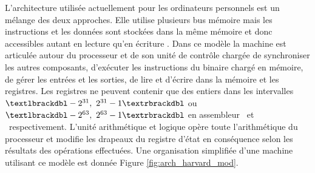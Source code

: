 L'architecture utilisée actuellement pour les ordinateurs personnels est un mélange des deux approches.
Elle utilise plusieurs bus mémoire mais les instructions et les données sont stockées dans la même mémoire et donc accessibles autant en lecture qu'en écriture \cite{timsit}.
Dans ce modèle la machine est articulée autour du processeur et de son unité de contrôle chargée de synchroniser les autres composants, d'exécuter les instructions du binaire chargé en mémoire, de gérer les entrées et les sorties, de lire et d'écrire dans la mémoire et les registres.
Les registres ne peuvent contenir que des entiers dans les intervalles $\textlbrackdbl -2^{31},\ 2^{31}-1\textrbrackdbl$ ou  $\textlbrackdbl -2^{63},\ 2^{63}-1\textrbrackdbl$ en assembleur \xq\ et \xs\ respectivement.
L'unité arithmétique et logique opère toute l'arithmétique du processeur et modifie les drapeaux du registre d'état en conséquence selon les résultats des opérations effectuées. 
Une organisation simplifiée d'une machine utilisant ce modèle est donnée Figure \ref{fig:arch_harvard_mod}.


